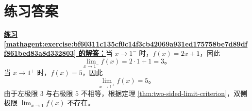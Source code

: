 \documentclass[UTF8,fontset=fandol,11pt]{ctexart}
\begin{document}
\section*{练习答案}
\par\noindent\textbf{\hyperref[mathagent:exercise:bf60311c135cf0c14f3cb42069a931ed175758be7d89dff861bed83a8d332803]{练习 \ref*{mathagent:exercise:bf60311c135cf0c14f3cb42069a931ed175758be7d89dff861bed83a8d332803} 的解答：}}当 $x\to1^-$ 时，$f(x)=2x+1$，因此
\[
\lim_{x\to1^-}f(x)=2\cdot1+1=3。
\]
当 $x\to1^+$ 时，$f(x)=5$，因此
\[
\lim_{x\to1^+}f(x)=5。
\]
由于左极限 $3$ 与右极限 $5$ 不相等，根据定理 \ref{thm:two-sided-limit-criterion}，双侧极限 $\lim_{x\to1}f(x)$ 不存在。\par
\end{document}
